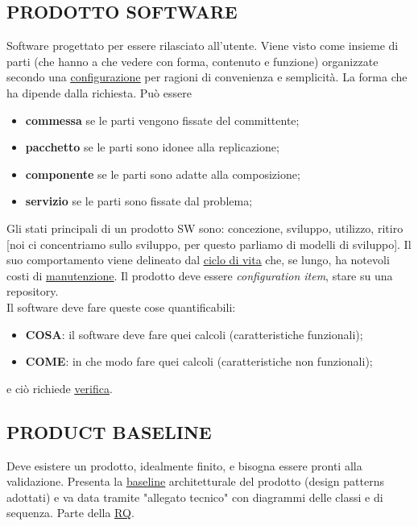 		\subsection{PRODOTTO SOFTWARE}  \label{prodotto}
		Software progettato per essere rilasciato all'utente. Viene visto come insieme di parti (che hanno a che vedere con forma, contenuto e funzione) organizzate secondo una \underline{\hyperref[configurazione]{configurazione}} per ragioni di convenienza e semplicità. La forma che ha dipende dalla richiesta. Può essere
			\begin{itemize}
				\item \textbf{commessa} se le parti vengono fissate del committente;
				\item \textbf{pacchetto} se le parti sono idonee alla replicazione;
				\item \textbf{componente} se le parti sono adatte alla composizione;
				\item \textbf{servizio} se le parti sono fissate dal problema;
			\end{itemize}
		Gli stati principali di un prodotto SW sono: concezione, sviluppo, utilizzo, ritiro [noi ci concentriamo sullo sviluppo, per questo parliamo di modelli di sviluppo].
		Il suo comportamento viene delineato dal \underline{\hyperref[ciclo]{ciclo di vita}} che, se lungo, ha notevoli costi di \underline{\hyperref[manutenzione]{manutenzione}}. 
		Il prodotto deve essere \textit{configuration item}, stare su una repository. \\
		Il software deve fare queste cose quantificabili:
		\begin{itemize}
			\item \textbf{COSA}: il software deve fare quei calcoli (caratteristiche funzionali);
			\item \textbf{COME}: in che modo fare quei calcoli (caratteristiche non funzionali);
		\end{itemize}
		e ciò richiede \underline{\hyperref[verificare]{verifica}}.
		
		\subsection{PRODUCT BASELINE}	 \label{productbaseline}
		Deve esistere un prodotto, idealmente finito, e bisogna essere pronti alla validazione. Presenta la \underline{\hyperref[baseline]{baseline}} architetturale del prodotto (design patterns adottati) e va data tramite "allegato tecnico" con diagrammi delle classi e di sequenza. Parte della \underline{\hyperref[RQ]{RQ}}.
		
